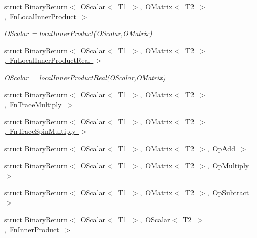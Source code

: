 \begin{DoxyCompactItemize}
\item 
struct \mbox{\hyperlink{structENSEM_1_1BinaryReturn_3_01OScalar_3_01T1_01_4_00_01OMatrix_3_01T2_01_4_00_01FnLocalInnerProduct_01_4}{Binary\+Return$<$ O\+Scalar$<$ T1 $>$, O\+Matrix$<$ T2 $>$, Fn\+Local\+Inner\+Product $>$}}
\begin{DoxyCompactList}\small\item\em \mbox{\hyperlink{classENSEM_1_1OScalar}{O\+Scalar}} = local\+Inner\+Product(\+O\+Scalar,\+O\+Matrix) \end{DoxyCompactList}\item 
struct \mbox{\hyperlink{structENSEM_1_1BinaryReturn_3_01OScalar_3_01T1_01_4_00_01OMatrix_3_01T2_01_4_00_01FnLocalInnerProductReal_01_4}{Binary\+Return$<$ O\+Scalar$<$ T1 $>$, O\+Matrix$<$ T2 $>$, Fn\+Local\+Inner\+Product\+Real $>$}}
\begin{DoxyCompactList}\small\item\em \mbox{\hyperlink{classENSEM_1_1OScalar}{O\+Scalar}} = local\+Inner\+Product\+Real(\+O\+Scalar,\+O\+Matrix) \end{DoxyCompactList}\item 
struct \mbox{\hyperlink{structENSEM_1_1BinaryReturn_3_01OScalar_3_01T1_01_4_00_01OMatrix_3_01T2_01_4_00_01FnTraceMultiply_01_4}{Binary\+Return$<$ O\+Scalar$<$ T1 $>$, O\+Matrix$<$ T2 $>$, Fn\+Trace\+Multiply $>$}}
\item 
struct \mbox{\hyperlink{structENSEM_1_1BinaryReturn_3_01OScalar_3_01T1_01_4_00_01OMatrix_3_01T2_01_4_00_01FnTraceSpinMultiply_01_4}{Binary\+Return$<$ O\+Scalar$<$ T1 $>$, O\+Matrix$<$ T2 $>$, Fn\+Trace\+Spin\+Multiply $>$}}
\item 
struct \mbox{\hyperlink{structENSEM_1_1BinaryReturn_3_01OScalar_3_01T1_01_4_00_01OMatrix_3_01T2_01_4_00_01OpAdd_01_4}{Binary\+Return$<$ O\+Scalar$<$ T1 $>$, O\+Matrix$<$ T2 $>$, Op\+Add $>$}}
\item 
struct \mbox{\hyperlink{structENSEM_1_1BinaryReturn_3_01OScalar_3_01T1_01_4_00_01OMatrix_3_01T2_01_4_00_01OpMultiply_01_4}{Binary\+Return$<$ O\+Scalar$<$ T1 $>$, O\+Matrix$<$ T2 $>$, Op\+Multiply $>$}}
\item 
struct \mbox{\hyperlink{structENSEM_1_1BinaryReturn_3_01OScalar_3_01T1_01_4_00_01OMatrix_3_01T2_01_4_00_01OpSubtract_01_4}{Binary\+Return$<$ O\+Scalar$<$ T1 $>$, O\+Matrix$<$ T2 $>$, Op\+Subtract $>$}}
\item 
struct \mbox{\hyperlink{structENSEM_1_1BinaryReturn_3_01OScalar_3_01T1_01_4_00_01OScalar_3_01T2_01_4_00_01FnInnerProduct_01_4}{Binary\+Return$<$ O\+Scalar$<$ T1 $>$, O\+Scalar$<$ T2 $>$, Fn\+Inner\+Product $>$}}

\end{DoxyCompactItemize}
